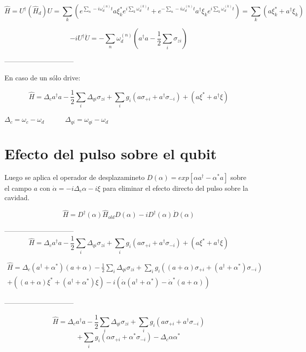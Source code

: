 \documentclass[11pt, spanish]{report}
\begin{document}
$$\hat{H} = U^\dagger (\hat{H}_d) U = \sum\limits_k (e^{\sum\limits_n-i \omega_d^{(n)} t}
a\xi_k^*e^{i\sum\limits_k \omega_d^{(k)}t}+ e^{-\sum\limits_n-i \omega_d^{(n)} t}
a^\dagger\xi_ke^{i\sum\limits_k \omega_d^{(k)}t}) = \sum\limits_k (a\xi_k^* + a^\dagger\xi_k)$$

$$- i U^\dagger \dot{U} = - \sum\limits_n \omega_d^{(n)}(a^\dagger a - \frac{1}{2} \sum\limits_i \sigma_{z i})$$

------------------------------

En caso de un sólo drive:

$$ \hat{H} = \Delta_c a^\dagger a - \frac{1}{2} \sum\limits_i \Delta_{qi} \sigma_{zi} + \sum\limits_i g_i (a \sigma_{+ i} + a^\dagger \sigma_{- i}) + (a\xi^*+a^\dagger\xi )$$

$\Delta_c = \omega_c - \omega_d \qquad \quad \Delta_{qi} = \omega_{qi} - \omega_d$

\section{Efecto del pulso sobre el qubit}

Luego se aplica el operador de desplazamineto $D(\alpha) = exp[\alpha a^\dagger - \alpha^* a]$ sobre el campo $a$ con $\dot{\alpha} = -i \Delta_c \alpha -i \xi $ para eliminar el efecto directo del pulso sobre la cavidad.

$$\hat{H} = D^\dagger (\alpha) \hat{H}_{old} D(\alpha) -i D^\dagger(\alpha) \dot{D}(\alpha)$$

------------------------------
$$ \hat{H} = \Delta_c a^\dagger a - \frac{1}{2} \sum\limits_i \Delta_{qi} \sigma_{zi} + \sum\limits_i g_i (a \sigma_{+ i} + a^\dagger \sigma_{- i}) + (a\xi^*+a^\dagger\xi )$$

\begin{align*}
  \hat{H} = \Delta_c (a^\dagger + \alpha^*) (a + \alpha) - \frac{1}{2} \sum\limits_i \Delta_{qi} \sigma_{zi} + \sum\limits_i g_i ((a+\alpha) \sigma_{+ i} + (a^\dagger+\alpha^*) \sigma_{- i}) \\
  + ((a+\alpha)\xi^*+(a^\dagger+\alpha^*)\xi ) -i(\dot{\alpha} (a^\dagger + \alpha^*) - \dot{\alpha}^* (a + \alpha))
\end{align*}


------------------------------

$$\hat{H} = \Delta_c a^\dagger a - \frac{1}{2} \sum\limits_i \Delta_{qi} \sigma_{zi} + \sum\limits_i g_i (a \sigma_{+i} + a^\dagger \sigma_{-i})$$
$$ + \sum\limits_i g_i (\alpha \sigma_{+i} + \alpha^* \sigma_{-i}) - \Delta_c \alpha \alpha^* $$
\end{document}
